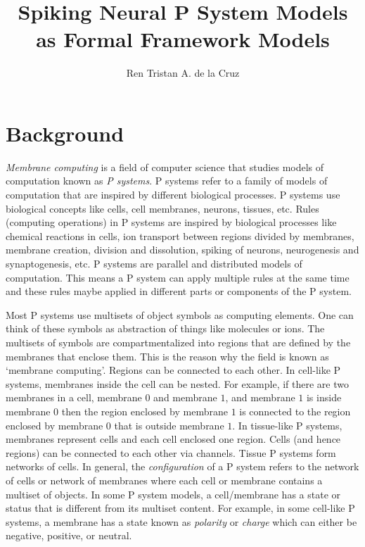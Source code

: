 \documentclass[a4paper]{article}
\theoremstyle{definition}
\begin{document}
\title
{
   Spiking Neural P System Models\\ as Formal Framework Models
}


\author
{
   Ren Tristan A. de la Cruz
}


\maketitle


\section{Background}\label{sec-background}

\emph{Membrane computing} is a field of computer science that studies models of computation known as
\emph{P systems}. P systems refer to a family of models of computation that are inspired by 
different biological processes. P systems use biological concepts like cells, cell membranes, 
neurons, tissues, etc. Rules (computing operations) in P systems are inspired by biological 
processes like chemical reactions in cells, ion transport between regions divided by membranes, 
membrane creation, division and dissolution, spiking of neurons, neurogenesis and synaptogenesis, 
etc. P systems are parallel and distributed models of computation. This means a P system can apply 
multiple rules at the same time and these rules maybe applied in different parts or components of
the P
system. 

Most P systems use multisets of object symbols as computing elements. One can think of these symbols
as abstraction of things like molecules or ions. The multisets of symbols are compartmentalized into
regions that are defined by the membranes that enclose them. This is the reason why the field is 
known as `membrane computing'. Regions can be connected to each other. In cell-like P systems, 
membranes inside the cell can be nested. For example, if there are two membranes in a cell, membrane
$0$ and membrane $1$, and membrane $1$ is inside membrane $0$ then the region enclosed by membrane 
$1$ is connected to the region enclosed by membrane $0$ that is outside membrane $1$. In tissue-like 
P systems, membranes represent cells and each cell enclosed one region. Cells (and hence regions) 
can be connected to each other via channels. Tissue P systems form networks of cells. In general, 
the \emph{configuration} of a P system refers to the network of cells or network of membranes where 
each cell or membrane contains a multiset of objects. In some P system models, a cell/membrane has a
state or status that is different from its multiset content. For example, in some cell-like P 
systems, a membrane has a state known as \emph{polarity} or \emph{charge} which can either be 
negative, positive, or neutral.
\end{document}
